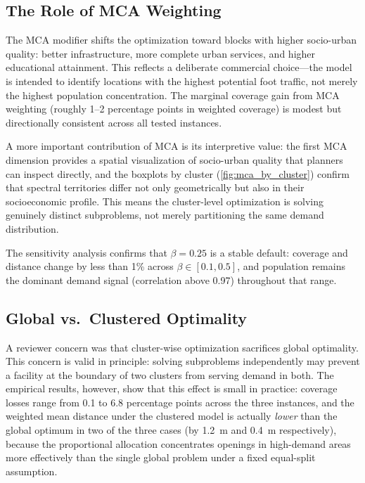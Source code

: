 \subsection{The Role of MCA Weighting}

The MCA modifier shifts the optimization toward blocks with higher
socio-urban quality: better infrastructure, more complete urban services,
and higher educational attainment.
This reflects a deliberate commercial choice---the model is intended to
identify locations with the highest potential foot traffic, not merely
the highest population concentration.
The marginal coverage gain from MCA weighting (roughly 1--2 percentage
points in weighted coverage) is modest but directionally consistent
across all tested instances.

A more important contribution of MCA is its interpretive value:
the first MCA dimension provides a spatial visualization of socio-urban
quality that planners can inspect directly, and the boxplots by cluster
(\cref{fig:mca_by_cluster}) confirm that spectral territories differ
not only geometrically but also in their socioeconomic profile.
This means the cluster-level optimization is solving genuinely distinct
subproblems, not merely partitioning the same demand distribution.

The sensitivity analysis confirms that $\beta = 0.25$ is a stable
default: coverage and distance change by less than 1\% across
$\beta \in [0.1, 0.5]$, and population remains the dominant demand
signal (correlation above 0.97) throughout that range.

\subsection{Global vs.\ Clustered Optimality}

A reviewer concern was that cluster-wise optimization sacrifices global
optimality.
This concern is valid in principle: solving subproblems independently
may prevent a facility at the boundary of two clusters from serving
demand in both.
The empirical results, however, show that this effect is small in practice:
coverage losses range from 0.1 to 6.8 percentage points across the three
instances, and the weighted mean distance under the clustered model is
actually \emph{lower} than the global optimum in two of the three cases
(by 1.2~m and 0.4~m respectively), because the proportional allocation
concentrates openings in high-demand areas more effectively than the
single global problem under a fixed equal-split assumption.

